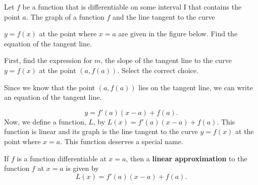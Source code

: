 \documentclass{ximera}
\begin{document}
\begin{example}
Let $f$ be a function that is differentiable on some interval I that contains the point $a$. The graph of a function $f$  and the line tangent to the curve

 $y=f(x)$ at the point where $x=a$ are given in the figure below.
Find the equation of the tangent line.
 \begin{image}
\end{image}
First, find the expression for $m$, the slope of the tangent line to the curve $y=f(x)$ at the point $(a,f(a))$.
 Select the correct choice.
 \begin{multipleChoice}

  \end{multipleChoice}
Since we know that the point $(a,f(a))$  lies on the tangent line,  we can write an equation of the tangent line. 

\[
y= f'(a)(x-a) +f(a).
\]
Now, we define a function, $L$,  by $L(x)= f'(a)(x-a) +f(a)$. This function is linear and its graph is the line tangent to the curve $y=f(x)$ at the point where $x=a$.
This function deserves a special name.
\end{example}
\begin{definition}
If $f$ is a function differentiable at $x=a$, then a \textbf{linear
  approximation} to the function $f$ at $x=a$ is given by
\[
L(x) = f'(a)(x-a) +f(a).
\]
\end{definition}
\end{document}
